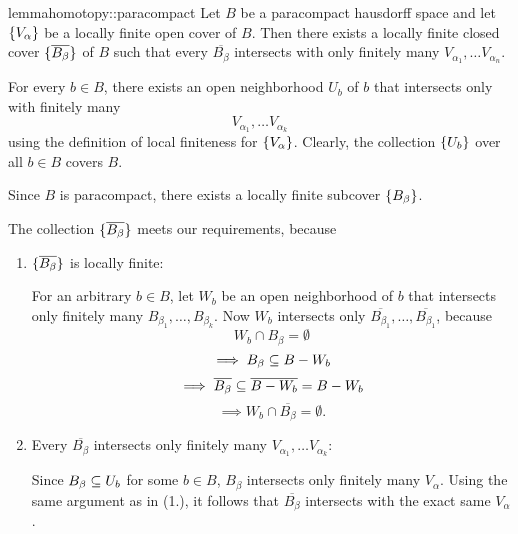 \begin{mystatement}{lemma}{homotopy::paracompact}
    Let $B$ be a paracompact hausdorff space and let $\{V_\alpha\}$
    be a locally finite open cover of $B$.
    Then there exists a locally finite closed cover $\{\overline{B_\beta}\}$ of $B$
    such that every $\overline{B_\beta}$ intersects with only
    finitely many $V_{\alpha_1}, \dots V_{\alpha_n}$.
\end{mystatement}

\begin{myproof}
    For every $b \in B$, there exists an open neighborhood $U_b$ of $b$
    that intersects only with finitely many
    \[ V_{\alpha_1}, \dots V_{\alpha_k} \]
    using the definition of local finiteness for $\{V_\alpha\}$.
    Clearly, the collection $\{U_b\}$ over all $b \in B$ covers $B$.

    Since $B$ is paracompact, there exists a locally finite subcover $\{B_\beta\}$.

    The collection $\{\overline{B_\beta}\}$ meets our requirements, because
    \begin{enumerate}
        \item $\{\overline{B_\beta}\}$ is locally finite:
        
        For an arbitrary $b \in B$, let $W_b$
        be an open neighborhood of $b$ that
        intersects only finitely many $B_{\beta_1}, \dots, B_{\beta_k}$.
        Now $W_b$ intersects only
        $\overline{B_{\beta_1}}, \dots, \overline{B_{\beta_1}}$, because
        \[ W_b \cap B_\beta = \emptyset \]
        \[ \implies B_\beta \subseteq{} B - W_b \]
        \[ \implies \overline{B_\beta} \subseteq{} \overline{B - W_b} = B - W_b \]
        \[ \implies W_b \cap \overline{B_\beta} = \emptyset. \]

        \item Every $\overline{B_\beta}$ intersects
        only finitely many $V_{\alpha_1}, \dots V_{\alpha_k}$:
        
        Since $B_\beta \subseteq{} U_b$ for some $b \in B$, $B_\beta$
        intersects only finitely many $V_\alpha$.
        Using the same argument as in (1.),
        it follows that $\overline{B_\beta}$ intersects
        with the exact same $V_\alpha$.
    \end{enumerate}
\end{myproof}